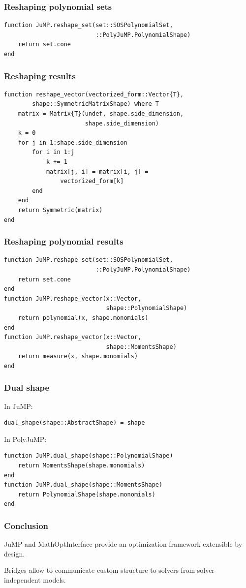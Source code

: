 \documentclass{beamer}
\begin{document}
\begin{frame}[fragile]
  \frametitle{Reshaping polynomial sets}
\begin{verbatim}
function JuMP.reshape_set(set::SOSPolynomialSet,
                          ::PolyJuMP.PolynomialShape)
    return set.cone
end
\end{verbatim}
\end{frame}

\begin{frame}[fragile]
  \frametitle{Reshaping results}
\begin{verbatim}
function reshape_vector(vectorized_form::Vector{T},
        shape::SymmetricMatrixShape) where T
    matrix = Matrix{T}(undef, shape.side_dimension,
                       shape.side_dimension)
    k = 0
    for j in 1:shape.side_dimension
        for i in 1:j
            k += 1
            matrix[j, i] = matrix[i, j] =
                vectorized_form[k]
        end
    end
    return Symmetric(matrix)
end
\end{verbatim}
\end{frame}

\begin{frame}[fragile]
  \frametitle{Reshaping polynomial results}
\begin{verbatim}
function JuMP.reshape_set(set::SOSPolynomialSet,
                          ::PolyJuMP.PolynomialShape)
    return set.cone
end
function JuMP.reshape_vector(x::Vector,
                             shape::PolynomialShape)
    return polynomial(x, shape.monomials)
end
function JuMP.reshape_vector(x::Vector,
                             shape::MomentsShape)
    return measure(x, shape.monomials)
end
\end{verbatim}
\end{frame}

\begin{frame}[fragile]
  \frametitle{Dual shape}
  In JuMP:
\begin{verbatim}
dual_shape(shape::AbstractShape) = shape
\end{verbatim}
  In PolyJuMP:
\begin{verbatim}
function JuMP.dual_shape(shape::PolynomialShape)
    return MomentsShape(shape.monomials)
end
function JuMP.dual_shape(shape::MomentsShape)
    return PolynomialShape(shape.monomials)
end
\end{verbatim}
\end{frame}

\begin{frame}
  \frametitle{Conclusion}
  JuMP and MathOptInterface provide an optimization framework \alert{extensible} by \alert{design}.

  \vspace{4em}

  Bridges allow to communicate \alert{custom} structure to solvers from \alert{solver-independent} models.
\end{frame}
\end{document}

